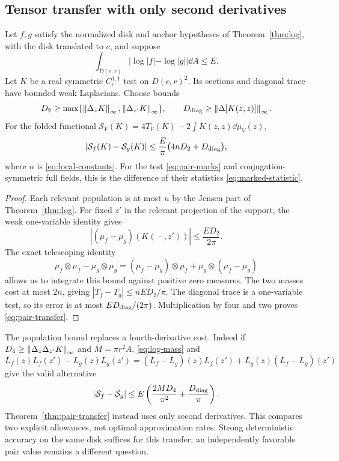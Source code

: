 \subsection{Tensor transfer with only second derivatives}

\begin{theorem}\label{thm:pair-transfer}
Let $f,g$ satisfy the normalized disk and anchor hypotheses of
Theorem~\ref{thm:log}, with the disk translated to $c$, and suppose
\[
 \int_{D(c,r)}|\log|f|-\log|g||\dd A\le E .
\]
Let $K$ be a real symmetric $C_c^{1,1}$ test on $D(c,r)^2$.
Its sections and diagonal trace have bounded weak Laplacians.
Choose bounds
\[
 D_2\ge\max\{\left\|\Delta_zK\right\|_\infty,
                  \left\|\Delta_{z'}K\right\|_\infty\},\qquad
 D_{\rm diag}\ge\left\|\Delta[K(z,z)]\right\|_\infty .
\]
For the folded functional
$\mathcal S_V(K)=4T_V(K)-2\int K(z,z)\dd\mu_V(z)$,
\begin{equation}\label{eq:pair-transfer}
 |\mathcal S_f(K)-\mathcal S_g(K)|
 \le\frac{E}{\pi}\bigl(4nD_2+D_{\rm diag}\bigr),
\end{equation}
where $n$ is \eqref{eq:local-constants}. For the test
\eqref{eq:pair-marks} and conjugation-symmetric full fields,
this is the difference of their statistics
\eqref{eq:marked-statistic}.
\end{theorem}
\begin{proof}
Each relevant population is at most $n$ by the Jensen part of
Theorem~\ref{thm:log}. For fixed $z'$ in the relevant projection
of the support, the weak one-variable identity gives
\[
 |(\mu_f-\mu_g)(K(\,\cdot\,,z'))|
 \le\frac{ED_2}{2\pi}.
\]
The exact telescoping identity
\[
 \mu_f\otimes\mu_f-\mu_g\otimes\mu_g
 =(\mu_f-\mu_g)\otimes\mu_f+
                         \mu_g\otimes(\mu_f-\mu_g)
\]
allows us to integrate this bound against positive zero measures.
The two masses cost at most $2n$, giving
$|T_f-T_g|\le nED_2/\pi$.
The diagonal trace is a one-variable test, so its error is at most
$ED_{\rm diag}/(2\pi)$. Multiplication by four and two proves
\eqref{eq:pair-transfer}.
\end{proof}

The population bound replaces a fourth-derivative cost. Indeed if
$D_4\ge\left\|\Delta_z\Delta_{z'}K\right\|_\infty$ and
$M=\pi r^2A$, \eqref{eq:log-mass} and
\[
 L_f(z)L_f(z')-L_g(z)L_g(z')
 =(L_f-L_g)(z)L_f(z')+L_g(z)(L_f-L_g)(z')
\]
give the valid alternative
\begin{equation}\label{eq:pair-fourth}
 |\mathcal S_f-\mathcal S_g|
 \le E\left(\frac{2MD_4}{\pi^2}
                      +\frac{D_{\rm diag}}{\pi}\right).
\end{equation}
Theorem~\ref{thm:pair-transfer} instead uses only second derivatives.
This compares two explicit allowances, not optimal approximation
rates. Strong deterministic accuracy on the same disk suffices
for this transfer; an independently favorable pair value remains
a different question.

